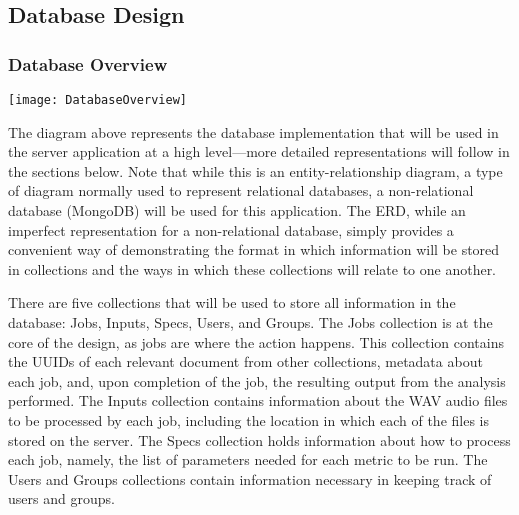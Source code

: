 \subsection{Database Design}
\subsubsection{Database Overview}
\begin{center}
  \texttt{[image: DatabaseOverview]} \\[12pt]
\end{center}
The diagram above represents the database implementation that will be used in the server application at a high level---more detailed representations will follow in the sections below. Note that while this is an entity-relationship diagram, a type of diagram normally used to represent relational databases, a non-relational database (MongoDB) will be used for this application. The ERD, while an imperfect representation for a non-relational database, simply provides a convenient way of demonstrating the format in which information will be stored in collections and the ways in which these collections will relate to one another.\par
There are five collections that will be used to store all information in the database: Jobs, Inputs, Specs, Users, and Groups. The Jobs collection is at the core of the design, as jobs are where the action happens. This collection contains the UUIDs of each relevant document from other collections, metadata about each job, and, upon completion of the job, the resulting output from the analysis performed. The Inputs collection contains information about the WAV audio files to be processed by each job, including the location in which each of the files is stored on the server. The Specs collection holds information about how to process each job, namely, the list of parameters needed for each metric to be run. The Users and Groups collections contain information necessary in keeping track of users and groups.\par

